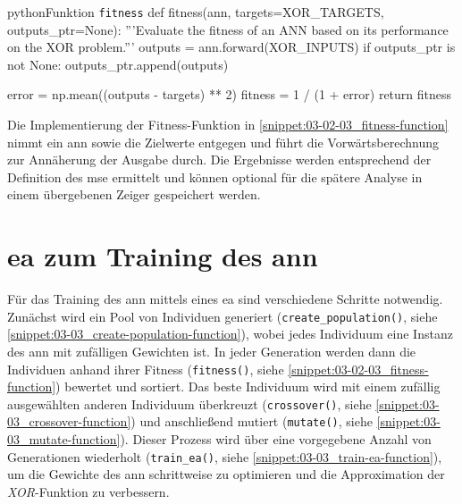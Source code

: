\begin{snippet}[htb]
    \centering
    \begin{codebox}{python}{Funktion \texttt{fitness}}
        def fitness(ann, targets=XOR_TARGETS, outputs_ptr=None):
            '''Evaluate the fitness of an ANN based on its performance on the XOR problem.'''
            outputs = ann.forward(XOR_INPUTS)
            if outputs_ptr is not None:
                outputs_ptr.append(outputs)
            
            error = np.mean((outputs - targets) ** 2)
            fitness = 1 / (1 + error)
            return fitness
    \end{codebox}
    \caption{Implementierung der Funktion \texttt{fitness()}}
    \label{snippet:03-02-03_fitness-function}
\end{snippet}

Die Implementierung der Fitness-Funktion in \autoref{snippet:03-02-03_fitness-function} nimmt ein \Gls{ann} sowie die Zielwerte entgegen und führt die Vorwärtsberechnung zur Annäherung der Ausgabe durch. Die Ergebnisse werden entsprechend der Definition des \Gls{mse} ermittelt und können optional für die spätere Analyse in einem übergebenen Zeiger gespeichert werden.

\section{\acrlong{ea} zum Training des \acrshort{ann}}
\label{sec:03-03_ea-for-training-ann}

Für das Training des \Gls{ann} mittels eines \Gls{ea} sind verschiedene Schritte notwendig. Zunächst wird ein Pool von Individuen generiert (\texttt{create\_population()}, siehe \autoref{snippet:03-03_create-population-function}), wobei jedes Individuum eine Instanz des \Gls{ann} mit zufälligen Gewichten ist. In jeder Generation werden dann die Individuen anhand ihrer Fitness (\texttt{fitness()}, siehe \autoref{snippet:03-02-03_fitness-function}) bewertet und sortiert. Das beste Individuum wird mit einem zufällig ausgewählten anderen Individuum überkreuzt (\texttt{crossover()}, siehe \autoref{snippet:03-03_crossover-function}) und anschließend mutiert (\texttt{mutate()}, siehe \autoref{snippet:03-03_mutate-function}). Dieser Prozess wird über eine vorgegebene Anzahl von Generationen wiederholt (\texttt{train\_ea()}, siehe \autoref{snippet:03-03_train-ea-function}), um die Gewichte des \Gls{ann} schrittweise zu optimieren und die Approximation der \textit{XOR}-Funktion zu verbessern.

